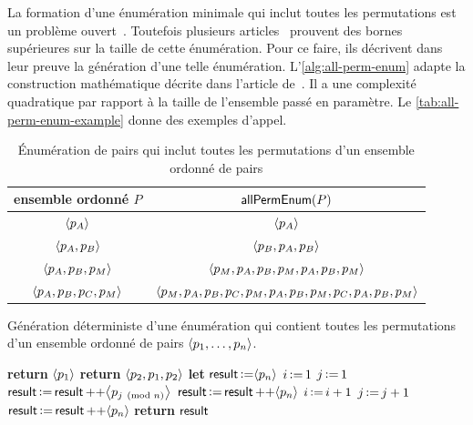 La formation d'une énumération minimale qui inclut toutes les permutations est un problème ouvert~\autocite{engen2018_containing}.
Toutefois plusieurs articles~\autocite{adleman_1974_shortperm,koutas1975shortest,galbiati1976permutation,zualinescu2011shorter,radomirovic2012construction} prouvent des bornes supérieures sur la taille de cette énumération.
Pour ce faire, ils décrivent dans leur preuve la génération d'une telle énumération.
L'\autoref{alg:all-perm-enum} adapte la construction mathématique décrite dans l'article de~\textcite{adleman_1974_shortperm}.
Il a une complexité quadratique par rapport à la taille de l'ensemble passé en paramètre.
Le \autoref{tab:all-perm-enum-example} donne des exemples d'appel.

\clearpage

\begin{table}[ht]
    \centering
    \begin{tabular}{cc}
        ensemble ordonné $P$ & $\trm{allPermEnum}(P)$ \\
        \toprule
        $\tuple*{p_A}$ & $\tuple*{p_A}$ \\
        $\tuple*{p_A, p_B}$ & $\tuple*{p_B, p_A, p_B}$ \\
        $\tuple*{p_A, p_B, p_M}$ & $\tuple*{p_M, p_A, p_B, p_M, p_A, p_B, p_M}$ \\
        $\tuple*{p_A, p_B, p_C, p_M}$ & $\tuple*{p_M, p_A, p_B, p_C, p_M, p_A, p_B, p_M, p_C, p_A, p_B, p_M}$ \\
    \end{tabular}
    \caption{Énumération de pairs qui inclut toutes les permutations d'un ensemble ordonné de pairs}\label{tab:all-perm-enum-example}
\end{table}

\begin{algorithm}[ht]
\caption{Génération déterministe d'une énumération qui contient toutes les permutations d'un ensemble ordonné de pairs $\tuple*{p_1, \dotsc, p_n}$.}\label{alg:all-perm-enum}
\begin{algorithmic}[1]
        \State \textbf{return} $\tuple*{p_1}$
        \State \textbf{return} $\tuple*{p_2, p_1, p_2}$
    \Else{}
        \State \textbf{let} $\trm{result} \assign \tuple*{p_n}$
        \State $i \assign 1$
        \State $j \assign 1$
            \State $\trm{result} \assign \trm{result} \lappend \tuple*{p_{j \pmod{n}}}$
                \State $\trm{result} \assign \trm{result} \lappend \tuple*{p_n}$
                \State $i \assign i + 1$
            \EndIf
            \State $j \assign j + 1$
        \EndWhile
        \State $\trm{result} \assign \trm{result} \lappend \tuple*{p_n}$
        \State \textbf{return} $\trm{result}$
    \EndIf
\EndFunction
\end{algorithmic}
\end{algorithm}

